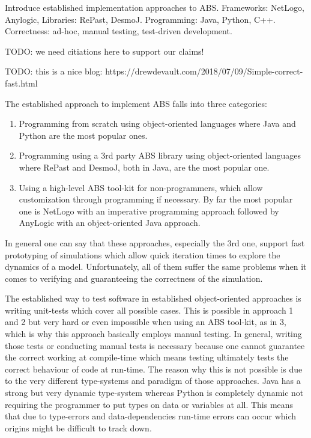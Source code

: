 Introduce established implementation approaches to ABS. Frameworks: NetLogo, Anylogic, Libraries: RePast, DesmoJ. Programming: Java, Python, C++. Correctness: ad-hoc, manual testing, test-driven development.

TODO: we need citiations here to support our claims!

TODO: this is a nice blog: https://drewdevault.com/2018/07/09/Simple-correct-fast.html

The established approach to implement ABS falls into three categories:
\begin{enumerate}
	\item Programming from scratch using object-oriented languages where Java and Python are the most popular ones.
	\item Programming using a 3rd party ABS library using object-oriented languages where RePast and DesmoJ, both in Java, are the most popular one.
	\item Using a high-level ABS tool-kit for non-programmers, which allow customization through programming if necessary. By far the most popular one is NetLogo with an imperative programming approach followed by AnyLogic with an object-oriented Java approach.
\end{enumerate}

In general one can say that these approaches, especially the 3rd one, support fast prototyping of simulations which allow quick iteration times to explore the dynamics of a model. Unfortunately, all of them suffer the same problems when it comes to verifying and guaranteeing the correctness of the simulation.

The established way to test software in established object-oriented approaches is writing unit-tests which cover all possible cases. This is possible in approach 1 and 2 but very hard or even impossible when using an ABS tool-kit, as in 3, which is why this approach basically employs manual testing. In general, writing those tests or conducting manual tests is necessary because one cannot guarantee the correct working at compile-time which means testing ultimately tests the correct behaviour of code at run-time. The reason why this is not possible is due to the very different type-systems and paradigm of those approaches. Java has a strong but very dynamic type-system whereas Python is completely dynamic not requiring the programmer to put types on data or variables at all. This means that due to type-errors and data-dependencies run-time errors can occur which origins might be difficult to track down.


